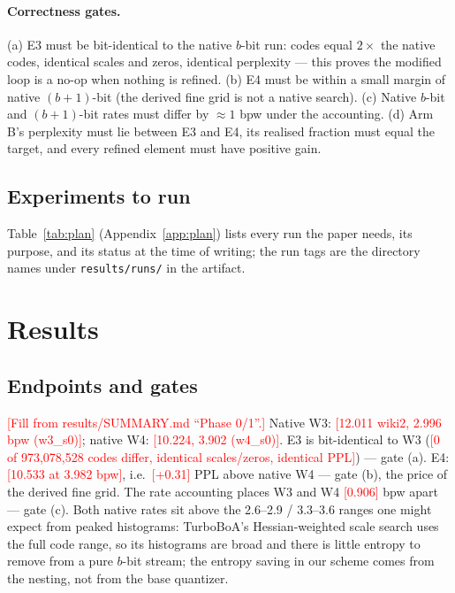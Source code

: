 \documentclass{article}
\newcommand{\tbd}[1]{\textcolor{red}{[#1]}}
\begin{document}
\paragraph{Correctness gates.} (a) E3 must be bit-identical to the native
$b$-bit run: codes equal $2\times$ the native codes, identical scales and
zeros, identical perplexity --- this proves the modified loop is a no-op
when nothing is refined. (b) E4 must be within a small margin of native
$(b{+}1)$-bit (the derived fine grid is not a native search). (c) Native
$b$-bit and $(b{+}1)$-bit rates must differ by $\approx 1$ bpw under the
accounting. (d) Arm B's perplexity must lie between E3 and E4, its
realised fraction must equal the target, and every refined element must
have positive gain.

\subsection{Experiments to run}

Table~\ref{tab:plan} (Appendix~\ref{app:plan}) lists every run the paper
needs, its purpose, and its status at the time of writing; the run tags
are the directory names under \texttt{results/runs/} in the artifact.



\section{Results}
\label{sec:results}

\subsection{Endpoints and gates}
\label{sec:endpoints}

\tbd{Fill from results/SUMMARY.md ``Phase 0/1''.} Native W3:
\tbd{12.011 wiki2, 2.996 bpw (w3\_s0)}; native W4: \tbd{10.224, 3.902
(w4\_s0)}. E3 is bit-identical to W3 (\tbd{0 of 973,078,528 codes
differ, identical scales/zeros, identical PPL}) --- gate (a). E4:
\tbd{10.533 at 3.982 bpw}, i.e.\ \tbd{+0.31} PPL above native W4 --- gate
(b), the price of the derived fine grid. The rate accounting places W3
and W4 \tbd{0.906} bpw apart --- gate (c). Both native rates sit above the
2.6--2.9 / 3.3--3.6 ranges one might expect from peaked histograms:
TurboBoA's Hessian-weighted scale search uses the full code range, so its
histograms are broad and there is little entropy to remove from a pure
$b$-bit stream; the entropy saving in our scheme comes from the nesting,
not from the base quantizer.
\end{document}
